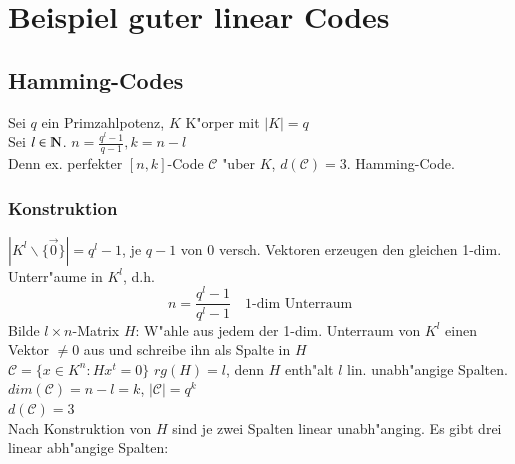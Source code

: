 \section{Beispiel guter linear Codes}
\subsection{Hamming-Codes}
Sei $q$ ein Primzahlpotenz, $K$ K"orper mit $\left| K \right| = q$\\
Sei $l \in  \N$. $n=\frac{q^l-1}{q-1}, k=n-l$  \\
Denn ex. perfekter $[n,k]$-Code $\mathcal{C}$ "uber $K$, $d(\mathcal{C})=3$.
Hamming-Code.
\subsubsection{Konstruktion}
$\left| K^l \backslash \lbrace \vec{0} \rbrace \right| = q^l -1$, je $q-1$ von $0$ versch. Vektoren erzeugen den gleichen 1-dim. Unterr"aume in $K^l$, d.h.
\[
	n = \frac{q^l-1}{q^l-1} \quad \text{1-dim Unterraum}
\]
Bilde $l\times n$-Matrix $H$: W"ahle aus jedem der 1-dim. Unterraum von $K^l$ einen Vektor $\neq 0$ aus und schreibe ihn als Spalte in $H$\\
$\mathcal{C} = \lbrace x \in K^n : Hx^t=0 \rbrace$
%
$rg(H)=l$, denn $H$ enth"alt $l$ lin. unabh"angige Spalten.\\
$dim(\mathcal{C})=n-l=k$, $\left| \mathcal{C} \right | = q^k$ \\
$d(\mathcal{C})=3$\\
Nach Konstruktion von $H$ sind je zwei Spalten linear unabh"anging. Es gibt drei linear abh"angige Spalten:
